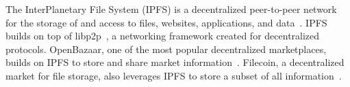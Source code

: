 The InterPlanetary File System (IPFS) is a decentralized peer-to-peer network for the storage of and access to files, websites, applications, and data~\cite{benet2014ipfs}.
IPFS builds on top of libp2p~\cite{benet2018libp2p}, a networking framework created for decentralized protocols.
OpenBazaar, one of the most popular decentralized marketplaces, builds on IPFS to store and share market information~\cite{openbazaar}.
Filecoin, a decentralized market for file storage, also leverages IPFS to store a subset of all information~\cite{benet2018filecoin}.

